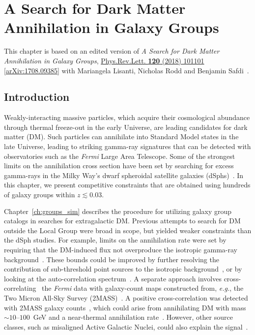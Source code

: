 \chapter{A Search for Dark Matter Annihilation in Galaxy Groups}
\label{ch:groups_data}

This chapter is based on an edited version of \emph{A Search for Dark Matter Annihilation in Galaxy Groups},  \href{https://journals.aps.org/prl/abstract/10.1103/PhysRevLett.120.101101}{Phys.Rev.Lett. \textbf{120} (2018) 101101} \href{https://arxiv.org/abs/1708.09385}{[arXiv:1708.09385]} with Mariangela Lisanti, Nicholas Rodd and Benjamin Safdi~\cite{Lisanti:2017qlb}.

\section{Introduction}

Weakly-interacting massive particles, which acquire their cosmological abundance through thermal freeze-out in the early Universe, are leading candidates for dark matter (DM).  Such particles can annihilate into Standard Model states in the late Universe, leading to striking gamma-ray signatures that can be detected with observatories such as the {\it Fermi} Large Area Telescope.  
Some of the strongest limits on the annihilation cross section have been set by searching for excess gamma-rays in the Milky Way's dwarf spheroidal satellite galaxies (dSphs)~\cite{Ackermann:2015zua,Fermi-LAT:2016uux}.  In this chapter, we present competitive constraints that are obtained using hundreds of galaxy groups within $z\lesssim0.03$. 

Chapter~\ref{ch:groups_sim} describes the procedure for utilizing  galaxy group catalogs in searches for extragalactic DM.  Previous attempts to search for DM outside the Local Group were broad in scope, but yielded weaker constraints than the dSph studies.  For example, limits on the annihilation rate were set by requiring that the DM-induced flux not overproduce the isotropic gamma-ray background~\cite{Ackermann:2015tah}.  These bounds could be improved by further resolving the contribution of sub-threshold point sources to the isotropic background~\cite{Zechlin:2016pme,Lisanti:2016jub}, or by  
looking at the auto-correlation spectrum~\cite{Ackermann:2012uf, Ackermann:2012uf,Ando:2006cr,Ando:2013ff}.  A separate approach involves cross-correlating~\cite{Xia:2011ax,Ando:2014aoa,Ando:2013xwa,Xia:2015wka,Regis:2015zka,Cuoco:2015rfa,Ando:2016ang} the {\it Fermi} data with galaxy-count maps constructed from, \emph{e.g.}, the Two Micron All-Sky Survey (2MASS)~\cite{Jarrett:2000me,Bilicki:2013sza}.  A positive cross-correlation was detected with 2MASS galaxy counts~\cite{Xia:2015wka}, which could arise from annihilating DM with mass $\sim$$10$--$100$~GeV and a near-thermal annihilation rate~\cite{Regis:2015zka}.  However, other source classes, such as misaligned Active Galactic Nuclei, could also explain the signal~\cite{Cuoco:2015rfa}.
  
